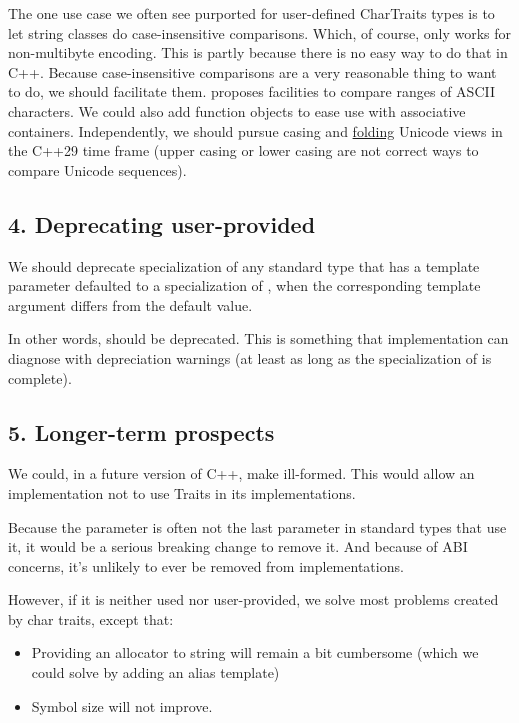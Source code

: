 \documentclass{wg21}
\begin{document}
The one use case we often see purported for user-defined CharTraits types is to let string classes do case-insensitive comparisons.
Which, of course, only works for non-multibyte encoding.
This is partly because there is no easy way to do that in C++.
Because case-insensitive comparisons are a very reasonable thing to want to do, we should facilitate them. \cite{P3688R0} proposes facilities
to compare ranges of ASCII characters. We could also add function objects to ease use with associative containers.
Independently, we should pursue casing and \href{https://www.w3.org/TR/charmod-norm/#definitionCaseFolding}{folding} Unicode views in the C++29 time frame (upper casing or lower casing are not correct ways to compare Unicode sequences).

\subsection{4. Deprecating user-provided }

We should deprecate specialization of any standard type that has a template parameter defaulted to a specialization of ,
when the corresponding template argument differs from the default value.

In other words,  should be deprecated.
This is something that implementation can diagnose with depreciation warnings (at least as long as the specialization of  is complete).

\subsection{5. Longer-term prospects}

We could, in a future version of C++, make  ill-formed.
This would allow an implementation not to use Traits in its implementations.

Because the  parameter is often not the last parameter in standard types that use it, it would be a serious breaking change to remove it.
And because of ABI concerns, it's unlikely to ever be removed from implementations.

However, if it is neither used nor user-provided, we solve most problems created by char traits, except that:
\begin{itemize}
\item Providing an allocator to string will remain a bit cumbersome (which we could solve by adding an alias template)
\item Symbol size will not improve.
\end{itemize}
\end{document}
